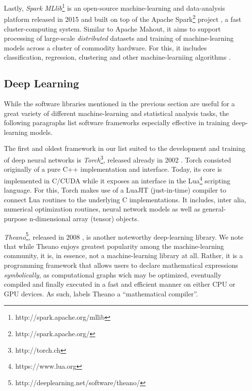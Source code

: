 Lastly, \emph{Spark MLlib}\footnote{http://spark.apache.org/mllib} is an
open-source machine-learning and data-analysis platform released in 2015 and
built on top of the Apache Spark\footnote{http://spark.apache.org/} project
\cite{spark}, a fast cluster-computing system. Similar to Apache Mahout, it aims
to support processing of large-scale \emph{distributed} datasets and training of
machine-learning models across a cluster of commodity hardware. For this, it
includes classification, regression, clustering and other machine-learniing
algorithms \cite{mllib}.

\subsection{Deep Learning}

While the software libraries mentioned in the previous section are useful for a
great variety of different machine-learning and statistical analysis tasks, the
following paragraphs list software frameworks especially effective in training
deep-learning models.

The first and oldest framework in our list suited to the development and
training of deep neural networks is \emph{Torch}\footnote{http://torch.ch},
released already in 2002 \cite{torch}. Torch consisted originally of a pure C++
implementation and interface. Today, its core is implemented in C/CUDA while it
exposes an interface in the Lua\footnote{https://www.lua.org} scripting
language. For this, Torch makes use of a LuaJIT (just-in-time) compiler to
connect Lua routines to the underlying C implementations. It includes, inter
alia, numerical optimization routines, neural network models as well as
general-purpose n-dimensional array (tensor) objects.

\emph{Theano}\footnote{http://deeplearning.net/software/theano/}, released in
2008 \cite{theano}, is another noteworthy deep-learning library. We note that
while Theano enjoys greatest popularity among the machine-learning community, it
is, in essence, not a machine-learning library at all. Rather, it is a
programming framework that allows users to declare mathematical expressions
\emph{symbolically}, as computational graphs wich may be optimized, eventually
compiled and finally executed in a fast and efficient manner on either CPU or
GPU devices. As such, \cite{theano} labels Theano a ``mathematical compiler''.

